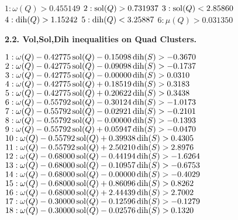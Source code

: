$1:  \omega(Q) > 0.455149$\newline
$2:  \operatorname{sol}(Q) > 0.731937$\newline
$3:  \operatorname{sol}(Q) < 2.85860$\newline
$4:  \operatorname{dih}(Q) > 1.15242$\newline
$5:  \operatorname{dih}(Q) < 3.25887$\newline
$6:  \mu(Q) > 0.031350$\newline

\smallskip

{\bf 2.2. Vol,Sol,Dih inequalities on Quad Clusters.}

\smallskip

$1:  \omega(Q) - 0.42775 \operatorname{sol}(Q) - 0.15098 \operatorname{dih}(S) > -0.3670$\newline
$2:  \omega(Q) - 0.42775 \operatorname{sol}(Q) - 0.09098 \operatorname{dih}(S) > -0.1737$\newline
$3:  \omega(Q) - 0.42775 \operatorname{sol}(Q) - 0.00000 \operatorname{dih}(S) > 0.0310$\newline
$4:  \omega(Q) - 0.42775 \operatorname{sol}(Q) + 0.18519 \operatorname{dih}(S) > 0.3183$\newline
$5:  \omega(Q) - 0.42775 \operatorname{sol}(Q) + 0.20622 \operatorname{dih}(S) > 0.3438$\newline
$6:  \omega(Q) - 0.55792 \operatorname{sol}(Q) - 0.30124 \operatorname{dih}(S) > -1.0173$\newline
$7:  \omega(Q) - 0.55792 \operatorname{sol}(Q) - 0.02921 \operatorname{dih}(S) > -0.2101$\newline
$8:  \omega(Q) - 0.55792 \operatorname{sol}(Q) - 0.00000 \operatorname{dih}(S) > -0.1393$\newline
$9:  \omega(Q) - 0.55792 \operatorname{sol}(Q) + 0.05947 \operatorname{dih}(S) > -0.0470$\newline
$10:  \omega(Q) - 0.55792 \operatorname{sol}(Q) + 0.39938 \operatorname{dih}(S) > 0.4305$\newline
$11:  \omega(Q) - 0.55792 \operatorname{sol}(Q) + 2.50210 \operatorname{dih}(S) > 2.8976$\newline
$12:  \omega(Q) - 0.68000 \operatorname{sol}(Q) - 0.44194 \operatorname{dih}(S) > -1.6264$\newline
$13:  \omega(Q) - 0.68000 \operatorname{sol}(Q) - 0.10957 \operatorname{dih}(S) > -0.6753$\newline
$14:  \omega(Q) - 0.68000 \operatorname{sol}(Q) - 0.00000 \operatorname{dih}(S) > -0.4029$\newline
$15:  \omega(Q) - 0.68000 \operatorname{sol}(Q) + 0.86096 \operatorname{dih}(S) > 0.8262$\newline
$16:  \omega(Q) - 0.68000 \operatorname{sol}(Q) + 2.44439 \operatorname{dih}(S) > 2.7002$\newline
$17:  \omega(Q) - 0.30000 \operatorname{sol}(Q) - 0.12596 \operatorname{dih}(S) > -0.1279$\newline
$18:  \omega(Q) - 0.30000 \operatorname{sol}(Q) - 0.02576 \operatorname{dih}(S) > 0.1320$\newline
